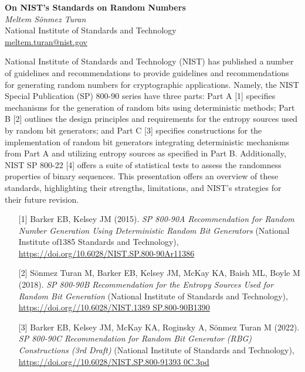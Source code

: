 \documentclass[12pt,a4paper,figuresright]{book}
\newenvironment{talk}[6]%
 {%
  \vskip 0pt\nopagebreak%
 \vskip 0pt\nopagebreak%
  \textbf{#1}\vspace{3mm}\\\nopagebreak%
  \textit{#2}\\\nopagebreak%
  #3\\\nopagebreak%
  \url{#4}\vspace{3mm}\\\nopagebreak%
  \ifthenelse{\equal{#5}{}}{}{Coauthor(s): #5\vspace{3mm}\\\nopagebreak}%
  \ifthenelse{\equal{#6}{}}{}{Special session: #6\quad \vspace{3mm}\\\nopagebreak}%
 }
 {\vspace{1cm}\nopagebreak}%
\begin{document}
	
\begin{talk}
  {On NIST's Standards on Random Numbers}%
  {Meltem S\"{o}nmez Turan}%
  {National Institute of Standards and Technology}%
  {meltem.turan@nist.gov}%
 {}%
  {}%
			
National Institute of Standards and Technology (NIST) has published a number of guidelines and recommendations to provide guidelines and recommendations for generating random numbers for cryptographic applications. Namely, the NIST Special Publication (SP) 800-90 series have three parts: Part A [1] specifies mechanisms for the generation of random bits using deterministic methods; Part B [2] outlines the design principles and requirements for the entropy sources used by random bit generators; and Part C [3] specifies constructions for the implementation of random bit generators integrating deterministic mechanisms from Part A and utilizing entropy sources as specified in Part B. Additionally, NIST SP 800-22 [4] offers a suite of statistical tests to assess the randomness properties of binary sequences. This presentation offers an overview of these standards, highlighting their strengths, limitations, and NIST's strategies for their future revision. 

\medskip

\begin{enumerate}
\item[{[1]}] Barker EB, Kelsey JM (2015). {\it SP 800-90A Recommendation for Random Number Generation Using Deterministic Random Bit Generators} (National Institute of1385
Standards and Technology), \url{https://doi.org/10.6028/NIST.SP.800-90Ar11386}

\item[{[2]}] S\"{o}nmez Turan M, Barker EB, Kelsey JM, McKay KA, Baish ML, Boyle M (2018). {\it SP 800-90B Recommendation for the Entropy Sources Used for Random Bit Generation} (National Institute of Standards and Technology), \url{https://doi.org//10.6028/NIST.1389
SP.800-90B1390}

\item[{[3]}] Barker EB, Kelsey JM, McKay KA, Roginsky A, S\"{o}nmez Turan M (2022). {\it SP 800-90C Recommendation for Random Bit Generator (RBG) Constructions (3rd Draft)} (National Institute of Standards and Technology), \url{https://doi.org//10.6028/NIST.SP.800-91393
0C.3pd}


\end{enumerate}
\end{talk}
\end{document}
